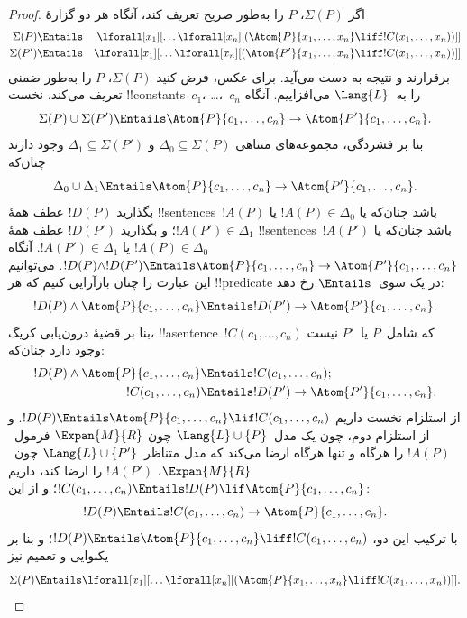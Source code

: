 \documentclass[../../../include/open-logic-section]{subfiles}
\begin{document}
\begin{proof}
اگر $\Sigma(P)$، $P$ را به‌طور صریح تعریف کند، آنگاه هر دو گزارهٔ
\begin{align*}
  \Sigma(P) & \Entails & \lforall[x_1][\dots \lforall[x_n]
    [(\Atom{P}{x_1,\dots, x_n} \liff !C(x_1,\dots,x_n))]]\\
  \Sigma(P') & \Entails & \lforall[x_1][\dots \lforall[x_n]
    [(\Atom{P'}{x_1,\dots, x_n} \liff !C(x_1,\dots,x_n))]]
\end{align*}
برقرارند و نتیجه به دست می‌آید. برای عکس، فرض کنید $\Sigma(P)$، $P$
را به‌طور ضمنی تعریف می‌کند. نخست !!{constant}s~$c_1$، \dots،~$c_n$
را به~$\Lang{L}$ می‌افزاییم. آنگاه
\[
\Sigma(P) \cup \Sigma(P') \Entails
\Atom{P}{c_1, \dots, c_n} \to  \Atom{P'}{c_1, \dots, c_n}.
\]
بنا بر فشردگی، مجموعه‌های متناهی
$\Delta_0 \subseteq \Sigma(P)$ و $\Delta_1 \subseteq \Sigma(P')$
وجود دارند چنان‌که
\[
\Delta_0 \cup \Delta_1 \Entails
\Atom{P}{c_1, \dots, c_n} \to \Atom{P'}{c_1, \dots, c_n}.
\]
بگذارید $!D(P)$ عطف همهٔ !!{sentence}s~$!A(P)$ باشد چنان‌که یا
$!A(P) \in \Delta_0$ یا $!A(P') \in \Delta_1$؛ و بگذارید $!D(P')$
عطف همهٔ !!{sentence}s~$!A(P')$ باشد چنان‌که یا
$!A(P) \in \Delta_0$ یا $!A(P') \in \Delta_1$. آنگاه
$!D(P) \land !D(P') \Entails \Atom{P}{c_1, \dots, c_n} \to
\Atom{P'}{c_1,\dots,c_n}$. می‌توانیم این عبارت را چنان بازآرایی کنیم
که هر !!{predicate} در یک سوی~$\Entails$ رخ دهد:
\[
!D(P) \land \Atom{P}{c_1, \dots, c_n} \Entails
!D(P') \to \Atom{P'}{c_1, \dots, c_n}.
\]
بنا بر قضیهٔ درون‌یابی کریگ، !!a{sentence}~$!C(c_1,\dots, c_n)$ که
شامل~$P$ یا~$P'$ نیست وجود دارد چنان‌که:
\begin{align*}
  !D(P) \land \Atom{P}{c_1, \dots, c_n} & \Entails !C(c_1,\dots, c_n); \\
  !C(c_1,\dots, c_n) & \Entails !D(P') \to \Atom{P'}{c_1, \dots, c_n}.
\end{align*}
از استلزام نخست داریم
$!D(P) \Entails \Atom{P}{c_1,\dots, c_n} \lif !C(c_1,\dots, c_n)$.
و از استلزام دوم، چون یک مدل~$\Lang{L} \cup \{P\}$ چون
$\Expan{M}{R}$ فرمول~$!A(P)$ را هرگاه و تنها هرگاه ارضا می‌کند که مدل
متناظر~$\Lang{L} \cup \{P'\}$ چون~$\Expan{M}{R}$، $!A(P')$ را ارضا
کند، داریم
$!C(c_1,\dots, c_n) \Entails !D(P) \lif \Atom{P}{c_1,\dots, c_n}$؛
و از این:
\[
!D(P) \Entails !C(c_1,\dots,c_n) \to \Atom{P}{c_1,\dots, c_n}.
\]
با ترکیب این دو،
$!D(P) \Entails \Atom{P}{c_1,\dots, c_n}
\liff !C(c_1, \dots, c_n)$؛ و بنا بر یکنوایی و تعمیم نیز
\[
\Sigma(P) \Entails
\lforall[x_1][\dots\lforall[x_n][(\Atom{P}{x_1,\dots, x_n} \liff
    !C(x_1,\dots, x_n))]].
\]
\end{proof}
\end{document}
